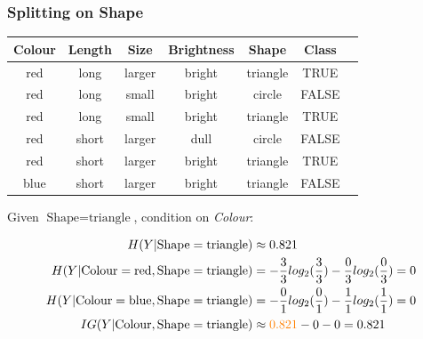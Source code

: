 \documentclass[aspectratio=169, 10pt]{beamer}
\begin{document}
\begin{frame}
    \frametitle{Splitting on Shape}
    \small

    \begin{table}[]
        \begin{tabular}{cccccc|l}
        Colour & Length & Size & Brightness & Shape & Class \\ \hline
        \rowcolor{lightgray} red & long & larger & bright & triangle & TRUE \\
        red & long & small & bright & circle & FALSE \\
        \rowcolor{lightgray} red & long & small & bright & triangle & TRUE \\
        red & short & larger & dull & circle & FALSE \\
        \rowcolor{lightgray} red & short & larger & bright & triangle & TRUE \\
        \rowcolor{lightgray} blue & short & larger & bright & triangle & FALSE
        \end{tabular}
    \end{table}

    Given $\text{Shape}=\text{triangle}$, condition on \textit{Colour}:

    \[
        \begin{split}
            H(Y|\text{Shape}=\text{triangle}) & \approx 0.821 \\
            H(Y|\text{Colour}=\text{red}, \text{Shape}=\text{triangle}) & = -\frac{3}{3} log_2(\frac{3}{3}) -\frac{0}{3} log_2(\frac{0}{3}) = 0 \\
            H(Y|\text{Colour}=\text{blue}, \text{Shape}=\text{triangle}) & = -\frac{0}{1} log_2(\frac{0}{1}) -\frac{1}{1} log_2(\frac{1}{1}) = 0 \\
            IG(Y|\text{Colour}, \text{Shape}=\text{triangle}) & \approx \textcolor{orange}{0.821} - 0 - 0 = 0.821
        \end{split}
    \]
\end{frame}
\end{document}
